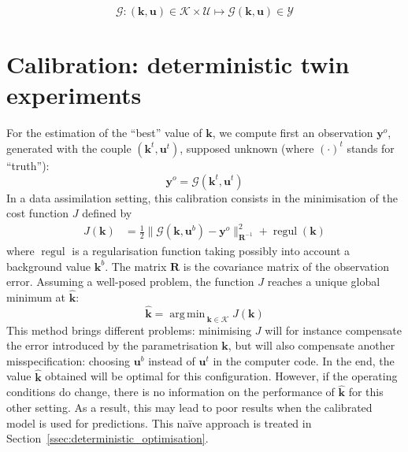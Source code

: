 \documentclass[npg, manuscript]{copernicus}
\newcommand{\yobs}{\mathbf{y}^o}
\DeclareMathOperator*{\argmin}{arg\,min \,}
\begin{document}
\begin{equation}
  \label{eq:def_M}
  \mathcal{G}: (\mathbf{k},\mathbf{u})\in \mathcal{K}\times\mathcal{U} \longmapsto \mathcal{G}(\mathbf{k},\mathbf{u}) \in \mathcal{Y}
\end{equation}
\section{Calibration: deterministic twin experiments}
\label{sec:deterministic}


For the estimation of the ``best'' value of $\mathbf{k}$, we compute first an observation $\yobs$, generated with the couple $(\mathbf{k}^t,\mathbf{u}^t)$, supposed unknown (where ${(\cdot)}^t$ stands for ``truth''):
\begin{equation}
  \yobs = \mathcal{G}(\mathbf{k}^t, \mathbf{u}^t)
\end{equation}
In a data assimilation setting, this calibration consists in the minimisation of the cost function $J$ defined by
\begin{align}
  \label{eq:def_cost_fun}
  J(\mathbf{k}) & = \frac12\|\mathcal{G}(\mathbf{k},\mathbf{u}^b) - \yobs \|_{\mathbf{R}^{-1}}^2 + \mathop{\mathrm{regul}}(\mathbf{k})%
\end{align}
where $\mathop{\mathrm{regul}}$ is a regularisation function taking possibly into account a background value $\mathbf{k}^b$. The matrix $\mathbf{R}$ is the covariance matrix of the observation error. Assuming a well-posed problem, the function $J$ reaches a unique global minimum at $\hat{\mathbf{k}}$:
\begin{equation}
  \label{eq:khat_def}
  \hat{\mathbf{k}} = \argmin_{\mathbf{k} \in \mathcal{K}} J(\mathbf{k})
\end{equation}
This method brings different problems: minimising $J$ will for instance compensate the error introduced by the parametrisation $\mathbf{k}$, but will also compensate another misspecification: choosing $\mathbf{u}^b$ instead of $\mathbf{u}^t$ in the computer code.
In the end, the value $\hat{\mathbf{k}}$ obtained will be optimal for this configuration. However, if the operating conditions do change, there is no information on the performance of $\hat{\mathbf{k}}$ for this other setting. As a result, this may lead to poor results when the calibrated model is used for predictions. This naïve approach is treated in Section~\ref{ssec:deterministic_optimisation}.
\end{document}
